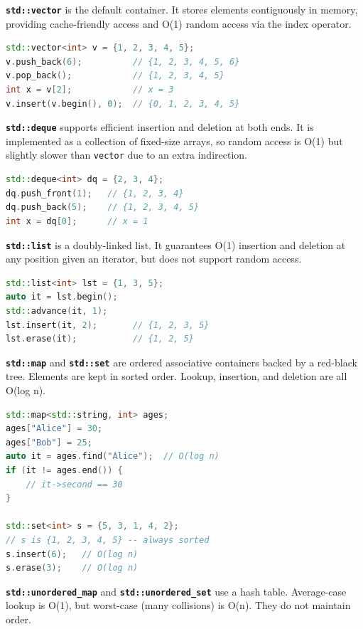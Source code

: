 \textbf{\texttt{std::vector}} is the default container. It stores elements contiguously in memory, providing cache-friendly access and O(1) random access via the index operator.

\begin{lstlisting}[language=C++]
std::vector<int> v = {1, 2, 3, 4, 5};
v.push_back(6);          // {1, 2, 3, 4, 5, 6}
v.pop_back();            // {1, 2, 3, 4, 5}
int x = v[2];            // x = 3
v.insert(v.begin(), 0);  // {0, 1, 2, 3, 4, 5}
\end{lstlisting}

\textbf{\texttt{std::deque}} supports efficient insertion and deletion at both ends. It is implemented as a collection of fixed-size arrays, so random access is O(1) but slightly slower than \texttt{vector} due to an extra indirection.

\begin{lstlisting}[language=C++]
std::deque<int> dq = {2, 3, 4};
dq.push_front(1);   // {1, 2, 3, 4}
dq.push_back(5);    // {1, 2, 3, 4, 5}
int x = dq[0];      // x = 1
\end{lstlisting}

\textbf{\texttt{std::list}} is a doubly-linked list. It guarantees O(1) insertion and deletion at any position given an iterator, but does not support random access.

\begin{lstlisting}[language=C++]
std::list<int> lst = {1, 3, 5};
auto it = lst.begin();
std::advance(it, 1);
lst.insert(it, 2);       // {1, 2, 3, 5}
lst.erase(it);           // {1, 2, 5}
\end{lstlisting}

\textbf{\texttt{std::map}} and \textbf{\texttt{std::set}} are ordered associative containers backed by a red-black tree. Elements are kept in sorted order. Lookup, insertion, and deletion are all O(log n).

\begin{lstlisting}[language=C++]
std::map<std::string, int> ages;
ages["Alice"] = 30;
ages["Bob"] = 25;
auto it = ages.find("Alice");  // O(log n)
if (it != ages.end()) {
    // it->second == 30
}

std::set<int> s = {5, 3, 1, 4, 2};
// s is {1, 2, 3, 4, 5} -- always sorted
s.insert(6);   // O(log n)
s.erase(3);    // O(log n)
\end{lstlisting}

\textbf{\texttt{std::unordered\_map}} and \textbf{\texttt{std::unordered\_set}} use a hash table. Average-case lookup is O(1), but worst-case (many collisions) is O(n). They do not maintain order.


